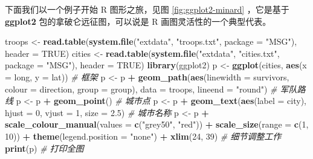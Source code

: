 \documentclass[
  b5paper,
  UTF8,twoside]{book}
\newenvironment{Shaded}{\begin{snugshade}}{\end{snugshade}}
\newcommand{\AttributeTok}[1]{\textcolor[rgb]{0.13,0.29,0.53}{#1}}
\newcommand{\CommentTok}[1]{\textcolor[rgb]{0.56,0.35,0.01}{\textit{#1}}}
\newcommand{\ConstantTok}[1]{\textcolor[rgb]{0.56,0.35,0.01}{#1}}
\newcommand{\DecValTok}[1]{\textcolor[rgb]{0.00,0.00,0.81}{#1}}
\newcommand{\FloatTok}[1]{\textcolor[rgb]{0.00,0.00,0.81}{#1}}
\newcommand{\FunctionTok}[1]{\textcolor[rgb]{0.13,0.29,0.53}{\textbf{#1}}}
\newcommand{\NormalTok}[1]{#1}
\newcommand{\OtherTok}[1]{\textcolor[rgb]{0.56,0.35,0.01}{#1}}
\newcommand{\SpecialCharTok}[1]{\textcolor[rgb]{0.81,0.36,0.00}{\textbf{#1}}}
\newcommand{\StringTok}[1]{\textcolor[rgb]{0.31,0.60,0.02}{#1}}
\begin{document}
下面我们以一个例子开始 R 图形之旅，见图 \ref{fig:ggplot2-minard} ，它是基于 \textbf{ggplot2} 包的拿破仑远征图，可以说是 R 画图灵活性的一个典型代表。





\begin{Shaded}
\begin{Highlighting}[]
\NormalTok{troops }\OtherTok{\textless{}{-}} \FunctionTok{read.table}\NormalTok{(}\FunctionTok{system.file}\NormalTok{(}\StringTok{"extdata"}\NormalTok{, }\StringTok{"troops.txt"}\NormalTok{, }\AttributeTok{package =} \StringTok{"MSG"}\NormalTok{), }\AttributeTok{header =} \ConstantTok{TRUE}\NormalTok{)}
\NormalTok{cities }\OtherTok{\textless{}{-}} \FunctionTok{read.table}\NormalTok{(}\FunctionTok{system.file}\NormalTok{(}\StringTok{"extdata"}\NormalTok{, }\StringTok{"cities.txt"}\NormalTok{, }\AttributeTok{package =} \StringTok{"MSG"}\NormalTok{), }\AttributeTok{header =} \ConstantTok{TRUE}\NormalTok{)}
\FunctionTok{library}\NormalTok{(ggplot2)}
\NormalTok{p }\OtherTok{\textless{}{-}} \FunctionTok{ggplot}\NormalTok{(cities, }\FunctionTok{aes}\NormalTok{(}\AttributeTok{x =}\NormalTok{ long, }\AttributeTok{y =}\NormalTok{ lat)) }\CommentTok{\# 框架}
\NormalTok{p }\OtherTok{\textless{}{-}}\NormalTok{ p }\SpecialCharTok{+} \FunctionTok{geom\_path}\NormalTok{(}\FunctionTok{aes}\NormalTok{(}\AttributeTok{linewidth =}\NormalTok{ survivors, }\AttributeTok{colour =}\NormalTok{ direction, }\AttributeTok{group =}\NormalTok{ group), }
                   \AttributeTok{data =}\NormalTok{ troops, }\AttributeTok{lineend =} \StringTok{"round"}\NormalTok{) }\CommentTok{\# 军队路线}
\NormalTok{p }\OtherTok{\textless{}{-}}\NormalTok{ p }\SpecialCharTok{+} \FunctionTok{geom\_point}\NormalTok{() }\CommentTok{\# 城市点}
\NormalTok{p }\OtherTok{\textless{}{-}}\NormalTok{ p }\SpecialCharTok{+} \FunctionTok{geom\_text}\NormalTok{(}\FunctionTok{aes}\NormalTok{(}\AttributeTok{label =}\NormalTok{ city), }\AttributeTok{hjust =} \DecValTok{0}\NormalTok{, }\AttributeTok{vjust =} \DecValTok{1}\NormalTok{, }\AttributeTok{size =} \FloatTok{2.5}\NormalTok{) }\CommentTok{\# 城市名称}
\NormalTok{p }\OtherTok{\textless{}{-}}\NormalTok{ p }\SpecialCharTok{+} \FunctionTok{scale\_colour\_manual}\NormalTok{(}\AttributeTok{values =} \FunctionTok{c}\NormalTok{(}\StringTok{"grey50"}\NormalTok{, }\StringTok{"red"}\NormalTok{)) }\SpecialCharTok{+} 
  \FunctionTok{scale\_size}\NormalTok{(}\AttributeTok{range =} \FunctionTok{c}\NormalTok{(}\DecValTok{1}\NormalTok{, }\DecValTok{10}\NormalTok{)) }\SpecialCharTok{+}
  \FunctionTok{theme}\NormalTok{(}\AttributeTok{legend.position =} \StringTok{"none"}\NormalTok{) }\SpecialCharTok{+} 
  \FunctionTok{xlim}\NormalTok{(}\DecValTok{24}\NormalTok{, }\DecValTok{39}\NormalTok{) }\CommentTok{\# 细节调整工作}
\FunctionTok{print}\NormalTok{(p) }\CommentTok{\# 打印全图}
\end{Highlighting}
\end{Shaded}
\end{document}
